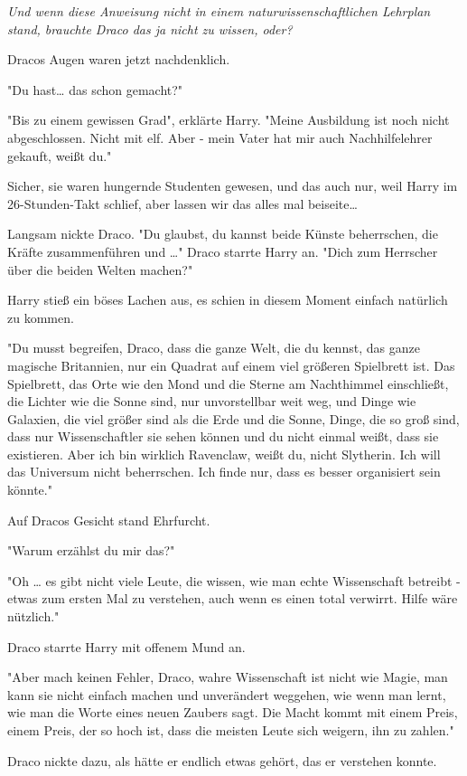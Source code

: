 {\emph{Und wenn diese Anweisung nicht in einem naturwissenschaftlichen Lehrplan stand, brauchte Draco das ja nicht zu wissen, oder?}

Dracos Augen waren jetzt nachdenklich.

"Du hast… das schon gemacht?"

"Bis zu einem gewissen Grad", erklärte Harry. "Meine Ausbildung ist noch nicht abgeschlossen. Nicht mit elf. Aber - mein Vater hat mir auch Nachhilfelehrer gekauft, weißt du."

Sicher, sie waren hungernde Studenten gewesen, und das auch nur, weil Harry im 26-Stunden-Takt schlief, aber lassen wir das alles mal beiseite…

Langsam nickte Draco. "Du glaubst, du kannst beide Künste beherrschen, die Kräfte zusammenführen und …" Draco starrte Harry an. "Dich zum Herrscher über die beiden Welten machen?"

Harry stieß ein böses Lachen aus, es schien in diesem Moment einfach natürlich zu kommen.

"Du musst begreifen, Draco, dass die ganze Welt, die du kennst, das ganze magische Britannien, nur ein Quadrat auf einem viel größeren Spielbrett ist. Das Spielbrett, das Orte wie den Mond und die Sterne am Nachthimmel einschließt, die Lichter wie die Sonne sind, nur unvorstellbar weit weg, und Dinge wie Galaxien, die viel größer sind als die Erde und die Sonne, Dinge, die so groß sind, dass nur Wissenschaftler sie sehen können und du nicht einmal weißt, dass sie existieren. Aber ich bin wirklich Ravenclaw, weißt du, nicht Slytherin. Ich will das Universum nicht beherrschen. Ich finde nur, dass es besser organisiert sein könnte."

Auf Dracos Gesicht stand Ehrfurcht.

"Warum erzählst du mir das?"

"Oh … es gibt nicht viele Leute, die wissen, wie man echte Wissenschaft betreibt - etwas zum ersten Mal zu verstehen, auch wenn es einen total verwirrt. Hilfe wäre nützlich."

Draco starrte Harry mit offenem Mund an.

"Aber mach keinen Fehler, Draco, wahre Wissenschaft ist nicht wie Magie, man kann sie nicht einfach machen und unverändert weggehen, wie wenn man lernt, wie man die Worte eines neuen Zaubers sagt. Die Macht kommt mit einem Preis, einem Preis, der so hoch ist, dass die meisten Leute sich weigern, ihn zu zahlen."

Draco nickte dazu, als hätte er endlich etwas gehört, das er verstehen konnte.

}
